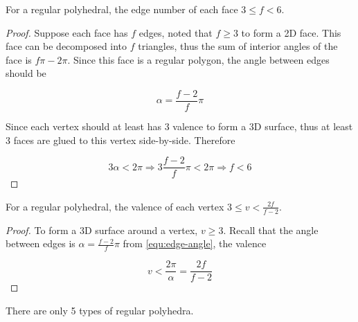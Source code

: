 \begin{lemma}
    For a regular polyhedral, the edge number of each face $3 \leq f < 6$.
\end{lemma}

\begin{proof}
    Suppose each face has $f$ edges, noted that $f \geq 3$ to form a 2D face. This face can be decomposed into $f$ triangles, thus the sum of interior angles of the face is $f\pi - 2\pi$. Since this face is a regular polygon, the angle between edges should be
    
    \begin{equation}
        \alpha = \frac{f-2}{f}\pi
        \label{equ:edge-angle}
    \end{equation}

    Since each vertex should at least has 3 valence to form a 3D surface, thus at least 3 faces are glued to this vertex side-by-side. Therefore
    
    \begin{equation}
        3 \alpha < 2 \pi
        \Rightarrow 3 \frac{f-2}{f}\pi < 2 \pi
        \Rightarrow f < 6
    \end{equation}
\end{proof}

\begin{lemma}
    For a regular polyhedral, the valence of each vertex $3 \leq v < \frac{2 f}{f - 2}$.
\end{lemma}

\begin{proof}
    To form a 3D surface around a vertex, $v \geq 3$. Recall that the angle between edges is $\alpha = \frac{f-2}{f}\pi$ from \autoref{equ:edge-angle}, the valence

    \begin{equation}
        v < \frac{2 \pi}{\alpha} = \frac{2 f}{f - 2}
    \end{equation}
\end{proof}

\begin{theorem}
    There are only 5 types of regular polyhedra.
\end{theorem}

